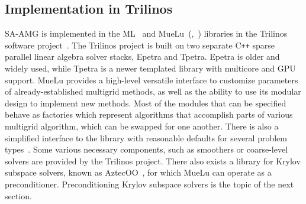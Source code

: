 \subsection{Implementation in Trilinos}

SA-AMG is implemented in the ML~\cite{ml-guide} and MueLu~(\cite{MueLu},~\cite{MueLuURL}) libraries in the Trilinos software project~\cite{10.1145/1089014.1089021}. The Trilinos project is built on two separate C{}\verb!++! sparse parallel linear algebra solver stacks, Epetra and Tpetra. Epetra is older and widely used, while Tpetra is a newer templated library with multicore and GPU support. MueLu provides a high-level versatile interface to customize parameters of already-established multigrid methods, as well as the ability to use its modular design to implement new methods. Most of the modules that can be specified behave as factories which represent algorithms that accomplish parts of various multigrid algorithm, which can be swapped for one another. There is also a simplified interface to the library with reasonable defaults for several problem types~\cite{Gaidamour2012}. Some various necessary components, such as smoothers or coarse-level solvers are provided by the Trilinos project. There also exists a library for Krylov subspace solvers, known as AztecOO~\cite{osti_974892}, for which MueLu can operate as a preconditioner. Preconditioning Krylov subspace solvers is the topic of the next section.

